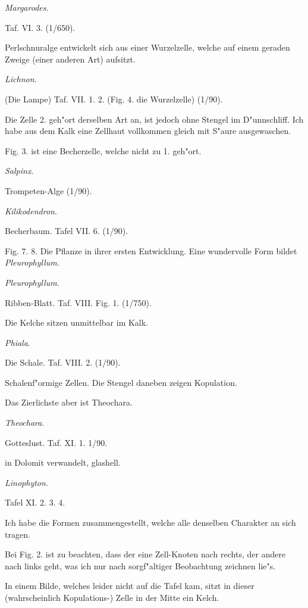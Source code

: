 \documentclass[a4paper, 11pt, oneside, german]{article}
\begin{document}
\centerline{\emph{Margarodes}.}

Taf. VI. 3. (1/650).

Perlschnuralge entwickelt sich aus einer Wurzelzelle, welche auf einem geraden Zweige (einer anderen Art) aufsitzt.

\centerline{\emph{Lichnon}.}

(Die Lampe) Taf. VII. 1. 2. (Fig. 4. die Wurzelzelle) (1/90).

Die Zelle 2. geh"ort derselben Art an, ist jedoch ohne Stengel im D"unnschliff. Ich habe aus dem Kalk eine Zellhaut vollkommen gleich mit S"aure ausgewaschen.

Fig. 3. ist eine Becherzelle, welche nicht zu 1. geh"ort.

\centerline{\emph{Salpinx}.}

Trompeten-Alge (1/90).

\centerline{\emph{Kilikodendron}.}

Becherbaum. Tafel VII. 6. (1/90).

Fig. 7. 8. Die Pflanze in ihrer ersten Entwicklung. Eine wundervolle Form bildet \emph{Pleurophyllum}.

\centerline{\emph{Pleurophyllum}.}

Ribben-Blatt. Taf. VIII. Fig. 1. (1/750).

Die Kelche sitzen unmittelbar im Kalk.

\centerline{\emph{Phiala}.}

Die Schale. Taf. VIII. 2. (1/90).

Schalenf"ormige Zellen. Die Stengel daneben zeigen Kopulation.

Das Zierlichste aber ist Theochara.

\centerline{\emph{Theochara}.}

Gotteslust. Taf. XI. 1. 1/90.

in Dolomit verwandelt, glashell.

\centerline{\emph{Linophyton}.}

Tafel XI. 2. 3. 4.

Ich habe die Formen zusammengestellt, welche alle denselben Charakter an sich tragen.

Bei Fig. 2. ist zu beachten, dass der eine Zell-Knoten nach rechts, der andere nach links geht, was ich nur nach sorgf"altiger Beobachtung zeichnen lie"s.

In einem Bilde, welches leider nicht auf die Tafel kam, sitzt in dieser (wahrscheinlich Kopulations-) Zelle in der Mitte ein Kelch.
\end{document}
